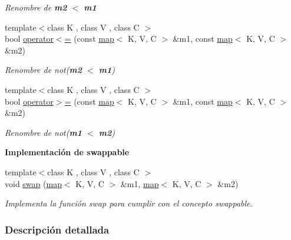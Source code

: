 \begin{Indent}
\begin{DoxyCompactItemize}
\begin{DoxyCompactList}\small\item\em Renombre de {\bfseries m2} $<$ {\bfseries m1} \end{DoxyCompactList}\item 
{\footnotesize template$<$class K , class V , class C $>$ }\\bool \hyperlink{classaed2_1_1map_afe374b37f17263d0cad3ee19a590d208_afe374b37f17263d0cad3ee19a590d208}{operator$<$=} (const \hyperlink{classaed2_1_1map}{map}$<$ K, V, C $>$ \&m1, const \hyperlink{classaed2_1_1map}{map}$<$ K, V, C $>$ \&m2)
\begin{DoxyCompactList}\small\item\em Renombre de not({\bfseries m2} $<$ {\bfseries m1}) \end{DoxyCompactList}\item 
{\footnotesize template$<$class K , class V , class C $>$ }\\bool \hyperlink{classaed2_1_1map_a093a6d1a055339c5fc6297a1d47a9159_a093a6d1a055339c5fc6297a1d47a9159}{operator$>$=} (const \hyperlink{classaed2_1_1map}{map}$<$ K, V, C $>$ \&m1, const \hyperlink{classaed2_1_1map}{map}$<$ K, V, C $>$ \&m2)
\begin{DoxyCompactList}\small\item\em Renombre de not({\bfseries m1} $<$ {\bfseries m2}) \end{DoxyCompactList}\end{DoxyCompactItemize}
\end{Indent}
\begin{Indent}\textbf{ Implementación de swappable}\par
\begin{DoxyCompactItemize}
\item 
{\footnotesize template$<$class K , class V , class C $>$ }\\void \hyperlink{classaed2_1_1map_a119cb2938bbc11c25ebd4fb824782a72_a119cb2938bbc11c25ebd4fb824782a72}{swap} (\hyperlink{classaed2_1_1map}{map}$<$ K, V, C $>$ \&m1, \hyperlink{classaed2_1_1map}{map}$<$ K, V, C $>$ \&m2)
\begin{DoxyCompactList}\small\item\em Implementa la función swap para cumplir con el concepto swappable. \end{DoxyCompactList}\end{DoxyCompactItemize}
\end{Indent}


\subsubsection{Descripción detallada}
